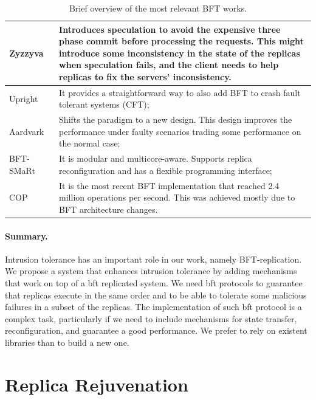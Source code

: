 \begin{table}[h]
\begin{center}
{\footnotesize
\begin{tabular}{ p{2.5cm}  p{10.5cm}  }\hline
Zyzzyva~\cite{Kotla:2010}  & Introduces speculation to avoid the expensive three phase commit before processing the requests. This might introduce some inconsistency in the state of the replicas when speculation fails, and the client needs to help replicas to fix the servers’ inconsistency. \\ \hline			
Upright~\cite{Clement:2009} & It provides a straightforward way to also add BFT to crash fault tolerant systems (CFT); \\ \hline	
Aardvark~\cite{Clement:2009b} & Shifts the paradigm to a new design. This design improves the performance under faulty scenarios trading some performance on the normal case; \\ \hline
BFT-SMaRt~\cite{Bessani:2014} & It is modular and multicore-aware. Supports replica reconfiguration and has a flexible programming interface; \\ \hline
COP~\cite{Behl:2015} & It is the most recent BFT implementation that reached 2.4 million operations per second. This was achieved mostly due to BFT architecture changes.\\  \hline  
\end{tabular}
}
\caption{Brief overview of the most relevant BFT works.}
\label{tab:bft}
\end{center}
\end{table}

\paragraph{Summary.} 
Intrusion tolerance has an important role in our work, namely BFT-replication.
We propose a system that enhances intrusion tolerance by adding mechanisms that work on
top of a \gls{bft} replicated system. We need \gls{bft} protocols to guarantee that replicas execute in
the same order and to be able to tolerate some malicious failures in a subset of the replicas.
The implementation of such \gls{bft} protocol is a complex task, particularly if we need to
include mechanisms for state transfer, reconfiguration, and guarantee a good performance.
We prefer to rely on existent libraries than to build a new one.



\section{Replica Rejuvenation}


